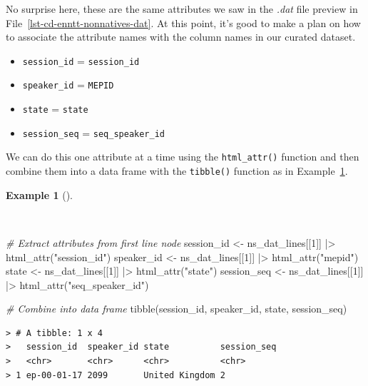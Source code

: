 \documentclass[
  letterpaper,
  DIV=11,
  numbers=noendperiod]{scrreport}
\newenvironment{Shaded}{\begin{snugshade}}{\end{snugshade}}
\newcommand{\CommentTok}[1]{\textcolor[rgb]{0.00,0.00,0.00}{\textit{#1}}}
\newcommand{\DecValTok}[1]{\textcolor[rgb]{0.00,0.00,0.00}{#1}}
\newcommand{\FunctionTok}[1]{\textcolor[rgb]{0.00,0.00,0.00}{#1}}
\newcommand{\NormalTok}[1]{\textcolor[rgb]{0.00,0.00,0.00}{#1}}
\newcommand{\OtherTok}[1]{\textcolor[rgb]{0.00,0.00,0.00}{#1}}
\newcommand{\SpecialCharTok}[1]{\textcolor[rgb]{0.00,0.00,0.00}{#1}}
\newcommand{\StringTok}[1]{\textcolor[rgb]{0.00,0.00,0.00}{#1}}
\providecommand{\tightlist}{%
  \setlength{\itemsep}{0pt}\setlength{\parskip}{0pt}}\usepackage{longtable,booktabs,array}
\theoremstyle{definition}
\newtheorem{example}{Example}[chapter]
\theoremstyle{remark}
\begin{document}
No surprise here, these are the same attributes we saw in the
\emph{.dat} file preview in File~\ref{lst-cd-enntt-nonnatives-dat}. At
this point, it's good to make a plan on how to associate the attribute
names with the column names in our curated dataset.

\begin{itemize}
\tightlist
\item
  \texttt{session\_id} = \texttt{session\_id}
\item
  \texttt{speaker\_id} = \texttt{MEPID}
\item
  \texttt{state} = \texttt{state}
\item
  \texttt{session\_seq} = \texttt{seq\_speaker\_id}
\end{itemize}

We can do this one attribute at a time using the \texttt{html\_attr()}
function and then combine them into a data frame with the
\texttt{tibble()} function as in
Example~\ref{exm-cd-enntt-extract-attributes}.

\begin{example}[]\protect\hypertarget{exm-cd-enntt-extract-attributes}{}\label{exm-cd-enntt-extract-attributes}

~

\begin{Shaded}
\begin{Highlighting}[]
\CommentTok{\# Extract attributes from first line node}
\NormalTok{session\_id }\OtherTok{\textless{}{-}}\NormalTok{ ns\_dat\_lines[[}\DecValTok{1}\NormalTok{]] }\SpecialCharTok{|\textgreater{}} \FunctionTok{html\_attr}\NormalTok{(}\StringTok{"session\_id"}\NormalTok{)}
\NormalTok{speaker\_id }\OtherTok{\textless{}{-}}\NormalTok{ ns\_dat\_lines[[}\DecValTok{1}\NormalTok{]] }\SpecialCharTok{|\textgreater{}} \FunctionTok{html\_attr}\NormalTok{(}\StringTok{"mepid"}\NormalTok{)}
\NormalTok{state }\OtherTok{\textless{}{-}}\NormalTok{ ns\_dat\_lines[[}\DecValTok{1}\NormalTok{]] }\SpecialCharTok{|\textgreater{}} \FunctionTok{html\_attr}\NormalTok{(}\StringTok{"state"}\NormalTok{)}
\NormalTok{session\_seq }\OtherTok{\textless{}{-}}\NormalTok{ ns\_dat\_lines[[}\DecValTok{1}\NormalTok{]] }\SpecialCharTok{|\textgreater{}} \FunctionTok{html\_attr}\NormalTok{(}\StringTok{"seq\_speaker\_id"}\NormalTok{)}

\CommentTok{\# Combine into data frame}
\FunctionTok{tibble}\NormalTok{(session\_id, speaker\_id, state, session\_seq)}
\end{Highlighting}
\end{Shaded}

\begin{verbatim}
> # A tibble: 1 x 4
>   session_id  speaker_id state          session_seq
>   <chr>       <chr>      <chr>          <chr>      
> 1 ep-00-01-17 2099       United Kingdom 2
\end{verbatim}

\end{example}
\end{document}
